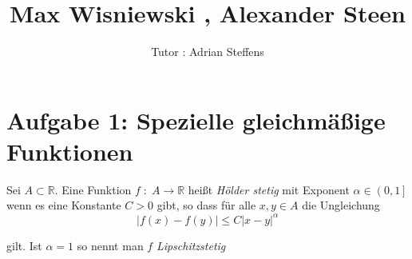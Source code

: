 \documentclass[11pt,a4paper,ngerman]{article}
\date{}
\title{Max Wisniewski , Alexander Steen}
\author{Tutor : Adrian Steffens}
\begin{document}

\maketitle
\thispagestyle{fancy}


\section*{Aufgabe 1: \mdseries Spezielle gleichmäßige Funktionen}

Sei $A \subset \mathbb{R}$. Eine Funktion $f \; : \; A \rightarrow \mathbb{R}$ heißt \emph{Hölder stetig} mit Exponent $\alpha \in \left( 0,1 \right]$ wenn es eine Konstante $C > 0$ gibt, so dass für alle $x,y \in A$ die Ungleichung
$$
    \left| f(x) - f(y)\right| \leq C \left| x - y \right|^\alpha
$$

gilt. Ist $\alpha = 1$ so nennt man $f$ \emph{Lipschitzstetig}
\end{document}
